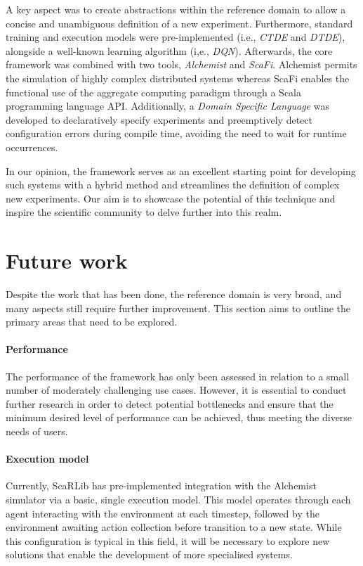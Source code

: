 \documentclass[12pt,a4paper,openright,twoside]{book}
\begin{document}
A key aspect was to create abstractions within the reference domain to allow a concise and unambiguous definition of a new experiment. 
    Furthermore, standard training and execution models were pre-implemented (i.e., \emph{CTDE} and \emph{DTDE}), alongside a well-known learning algorithm (i,e., \emph{DQN}). 
    Afterwards, the core framework was combined with two tools, \emph{Alchemist} and \emph{ScaFi}. Alchemist permits the simulation of highly complex
    distributed systems whereas ScaFi enables the functional use of the aggregate computing paradigm through a Scala 
    programming language API. Additionally, a \emph{Domain Specific Language} was developed to declaratively specify 
    experiments and preemptively detect configuration errors during compile time, avoiding the need to wait for runtime occurrences.

In our opinion, the framework serves as an excellent starting point for developing such systems with a hybrid method 
    and streamlines the definition of complex new experiments. Our aim is to showcase the potential of this technique 
    and inspire the scientific community to delve further into this realm.

\section{Future work}

Despite the work that has been done, the reference domain is very broad, 
    and many aspects still require further improvement. This section aims to outline the primary areas 
    that need to be explored.

\paragraph{Performance}
The performance of the framework has only been assessed in relation to a small number of moderately 
    challenging use cases. However, it is essential to conduct further research in order to detect 
    potential bottlenecks and ensure that the minimum desired level of performance can be achieved, 
    thus meeting the diverse needs of users.

\paragraph{Execution model}
Currently, ScaRLib has pre-implemented integration with the Alchemist simulator via a basic, single execution model. 
    This model operates through each agent interacting with the environment at each timestep, followed by the
    environment awaiting action collection before transition to a new state. While this configuration is typical 
    in this field, it will be necessary to explore new solutions that enable the development of more specialised systems.
\end{document}
